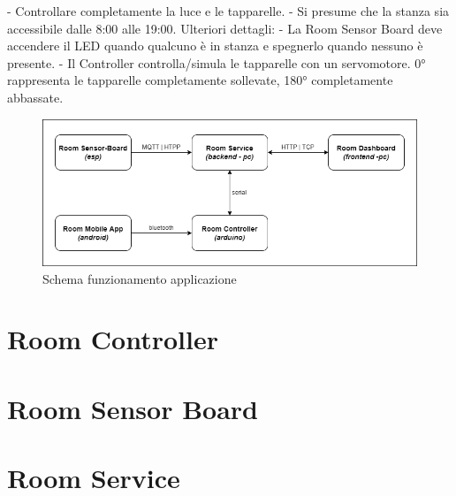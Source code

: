 \documentclass[12pt]{article}
\begin{document}
- Controllare completamente la luce e le tapparelle.\newline
- Si presume che la stanza sia accessibile dalle 8:00 alle 19:00.\newline
Ulteriori dettagli:\newline
- La Room Sensor Board deve accendere il LED quando qualcuno è in stanza e spegnerlo quando nessuno è presente.\newline
- Il Controller controlla/simula le tapparelle con un servomotore. 0° rappresenta le tapparelle completamente sollevate, 180° completamente abbassate.
\vskip 0.3cm
\begin{figure}[H]
    \includegraphics[width=17cm]{application-schema.png}
    \centering
    \caption{Schema funzionamento applicazione}
    \centering
\end{figure}

\newpage

\section{Room Controller}



\newpage

\section{Room Sensor Board}



\newpage

\section{Room Service}



\newpage
\end{document}
